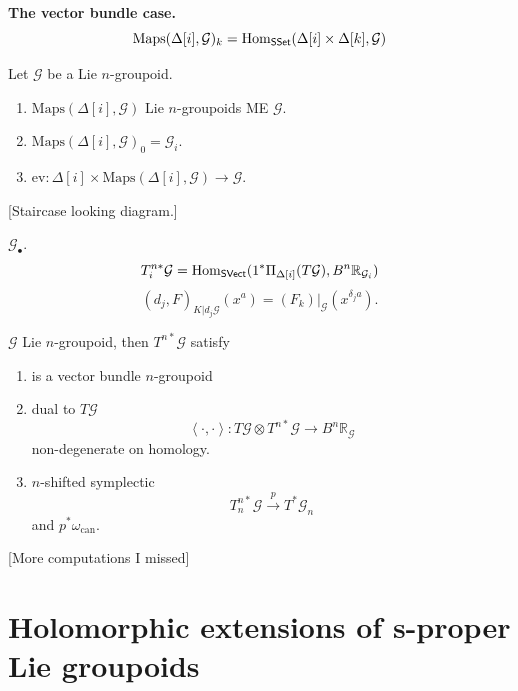 \medskip\noindent
{\bf The vector bundle case.}
$$
\text{Maps}(\Delta[i],\mathcal{G})_k=
\mathop{\mathrm{Hom}}\nolimits_{\mathsf{SSet}}(\Delta[i]\times\Delta[k]
,\mathcal{G})
$$
\begin{proposition}
\label{proposition-on-an-n-Lie-groupoid}
Let $\mathcal{G}$ be a Lie $n$-groupoid.
\begin{enumerate}
\item $\text{Maps}(\Delta[i],\mathcal{G})$
Lie $n$-groupoids ME $\mathcal{G}$.
\item
$\text{Maps}(\Delta[i],\mathcal{G})_0=
\mathcal{G}_i$.
\item $\text{ev}:\Delta[i]\times
\text{Maps}(\Delta[i],\mathcal{G})\to
\mathcal{G}$.
\end{enumerate}
\end{proposition}

[Staircase looking diagram.]

\begin{definition}
\label{definition-what-is-this}
$\mathcal{G}_\bullet$.
$$
T_i^{n*}\mathcal{G}=\mathop{\mathrm{Hom}}\nolimits_{\mathsf{SVect}}(1^*
\Pi_{\Delta[i]}(T\mathcal{G}),
B^n\mathbb{R}_{\mathcal{G}_i})
$$
$$
(d_j,F)_{K|d_j\mathcal{G}}(x^a)=(F_k)
|_{\mathcal{G}}(x^{\delta_ja}).
$$
\end{definition}

\begin{proposition}
\label{proposition-properties-of-that}
$\mathcal{G}$ Lie $n$-groupoid, then
$T^{n*}\mathcal{G}$ satisfy
\begin{enumerate}
\item is a vector bundle $n$-groupoid
\item dual to $T\mathcal{G}$
$$
\left\langle{}\cdot,\cdot\right\rangle{}:T\mathcal{G} \otimes
T^{n*}\mathcal{G}
\to B^n\mathbb{R}_{\mathcal{G}}
$$
non-degenerate on homology.
\item $n$-shifted symplectic
$$
T^{n*}_n\mathcal{G}\overset{p}{\to}
T^*\mathcal{G}_n
$$
and $p^*\omega_{\text{can}}$.
\end{enumerate}
\end{proposition}

[More computations I missed]

\section{Holomorphic extensions of s-proper
Lie groupoids}
\label{section-holom-exten-s-prope-lie}

